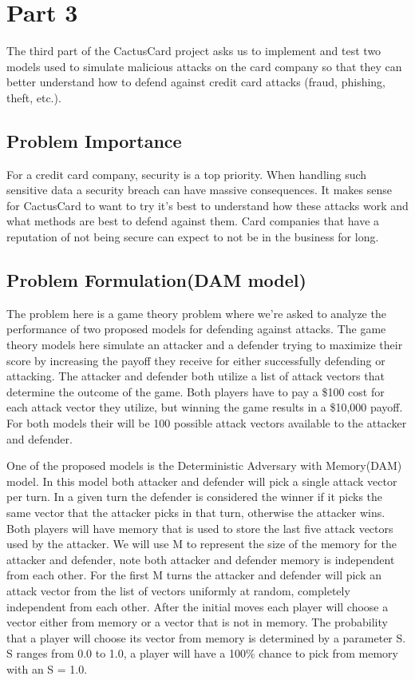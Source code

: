 \documentclass[11pt,journal]{IEEEtran}
\begin{document}
\section{Part 3} \label{part3}
The third part of the CactusCard project asks us to implement and test two models used to simulate malicious attacks on the card company so that they can better understand how to defend against credit card attacks (fraud, phishing, theft, etc.).

\subsection{Problem Importance}
For a credit card company, security is a top priority. When handling such sensitive data a security breach can have massive consequences. It makes sense for CactusCard to want to try it's best to understand how these attacks work and what methods are best to defend against them. Card companies that have a reputation of not being secure can expect to not be in the business for long.

\subsection{Problem Formulation(DAM model)}
The problem here is a game theory problem where we're asked to analyze the performance of two proposed models for defending against attacks. The game theory models here simulate an attacker and a defender trying to maximize their score by increasing the payoff they receive for either successfully defending or attacking. The attacker and defender both utilize a list of attack vectors that determine the outcome of the game. Both players have to pay a \$100 cost for each attack vector they utilize, but winning the game results in a \$10,000 payoff. For both models their will be 100 possible attack vectors available to the attacker and defender.
\par
One of the proposed models is the Deterministic Adversary with Memory(DAM) model. In this model both attacker and defender will pick a single attack vector per turn. In a given turn the defender is considered the winner if it picks the same vector that the attacker picks in that turn, otherwise the attacker wins. Both players will have memory that is used to store the last five attack vectors used by the attacker. We will use M to represent the size of the memory for the attacker and defender, note both attacker and defender memory is independent from each other. For the first M turns the attacker and defender will pick an attack vector from the list of vectors uniformly at random, completely independent from each other. After the initial moves each player will choose a vector either from memory or a vector that is not in memory. The probability that a player will choose its vector from memory is determined by a parameter S. S ranges from 0.0 to 1.0, a player will have a 100\% chance to pick from memory with an S = 1.0.
\end{document}
